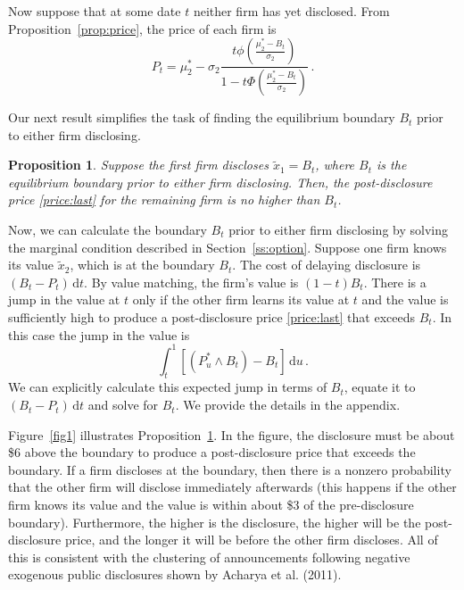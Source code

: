 \documentclass[ecta,nameyear,draft]{econsocart}
\theoremstyle{theorem}
\newtheorem{proposition}{Proposition}
\numberwithin{lemma}{section}
\numberwithin{proposition}{section}
\numberwithin{equation}{section}
\numberwithin{figure}{section}
\newcommand{\D}{\mathrm{d}}
\begin{document}
Now suppose that at some date $t$ neither firm has yet disclosed.  From Proposition~\ref{prop:price}, the price of each firm is
\begin{equation}
    P_t = \mu^*_2 - \sigma_2 \frac{t \phi\left(\frac{\mu^*_2 - B_t}{\sigma_2}\right)}
    {1 - t \Phi\left(\frac{\mu^*_2 - B_t}{\sigma_2}\right)}\,.
\end{equation}

Our next result simplifies the task of finding the equilibrium boundary $B_t$ prior to either firm disclosing.

\begin{proposition}\label{prop:keylemma}
Suppose the first firm discloses $\tilde x_1 = B_t$, where $B_t$ is the equilibrium boundary prior to either firm disclosing.  Then, the post-disclosure price \eqref{price:last} for the remaining firm is no higher than $B_t$.
\end{proposition}

Now, we can calculate the boundary $B_t$ prior to either firm disclosing by solving the marginal condition described in Section~\ref{ss:option}. 
Suppose one firm knows its value $\tilde x_2$, which is at the boundary $B_t$.  The cost of delaying disclosure is $(B_t-P_t)\,\D t$.  By value matching, the firm's value is $(1-t)B_t$.  There is a jump in the value at $t$ only if the other firm learns its value at $t$ and the value is sufficiently high to produce a post-disclosure price \eqref{price:last} that exceeds $B_t$.  In this case the jump in the value is
\begin{equation}
    \int_t^1 [(P^*_u \wedge B_t) - B_t]\,\D u\,.
\end{equation}
We can explicitly calculate this expected jump in terms of $B_t$, equate it to $(B_t-P_t)\,\D t$ and solve for $B_t$.  We provide the details in the appendix.

Figure~\ref{fig1} illustrates Proposition~\ref{prop:keylemma}.  In the figure, the disclosure must be about \$6 above the boundary to produce a post-disclosure price that exceeds the boundary.  If a firm discloses at the boundary, then there is a nonzero probability that the other firm will disclose immediately afterwards (this happens if the other firm knows its value and the value is within about \$3 of the pre-disclosure boundary).  Furthermore, the higher is the disclosure, the higher will be the post-disclosure price, and the longer it will be before the other firm discloses.  All of this is consistent with the clustering of announcements following negative exogenous public disclosures shown by Acharya et al. (2011). 
\end{document}

